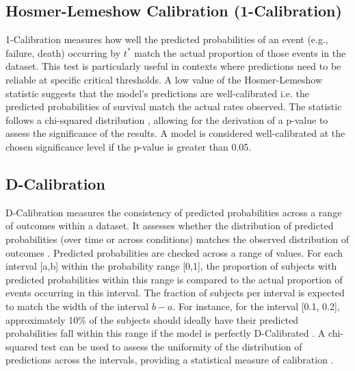 \subsection{Hosmer-Lemeshow Calibration (1-Calibration)}
1-Calibration \parencite{haider_effective_2018} measures how well the predicted probabilities of an event (e.g., failure, death) occurring by \(t^{*}\) match the actual proportion of those events in the dataset. This test is particularly useful in contexts where predictions need to be reliable at specific critical thresholds. A low value of the Hosmer-Lemeshow statistic \parencite{qi_effective_2023} suggests that the model's predictions are well-calibrated i.e. the predicted probabilities of survival match the actual rates observed. The statistic follows a chi-squared distribution \parencite{qi_effective_2023}, allowing for the derivation of a p-value to assess the significance of the results. A model is considered well-calibrated at the chosen significance level if the p-value is greater than 0.05.

\subsection{D-Calibration}
D-Calibration measures the consistency of predicted probabilities across a range of outcomes within a dataset. It assesses whether the distribution of predicted probabilities (over time or across conditions) matches the observed distribution of outcomes \parencite{haider_effective_2018}. Predicted probabilities are checked across a range of values. For each interval [a,b] within the probability range [0,1], the proportion of subjects with predicted probabilities within this range is compared to the actual proportion of events occurring in this interval. The fraction of subjects per interval is expected to match the width of the interval \(b-a\). For instance, for the interval [0.1, 0.2], approximately 10\% of the subjects should ideally have their predicted probabilities fall within this range if the model is perfectly D-Calibrated \parencite{haider_effective_2018}. A chi-squared test can be used to assess the uniformity of the distribution of predictions across the intervals, providing a statistical measure of calibration \parencite{haider_effective_2018}.

